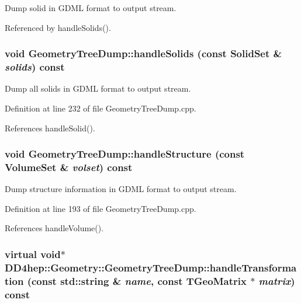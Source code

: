 Dump solid in GDML format to output stream. 

Referenced by handleSolids().\hypertarget{class_d_d4hep_1_1_geometry_1_1_geometry_tree_dump_a1cc5f19fc66c9e73f4837824f252a2c5}{
\subsubsection[{handleSolids}]{\setlength{\rightskip}{0pt plus 5cm}void GeometryTreeDump::handleSolids (const {\bf SolidSet} \& {\em solids}) const}}
\label{class_d_d4hep_1_1_geometry_1_1_geometry_tree_dump_a1cc5f19fc66c9e73f4837824f252a2c5}


Dump all solids in GDML format to output stream. 

Definition at line 232 of file GeometryTreeDump.cpp.

References handleSolid().\hypertarget{class_d_d4hep_1_1_geometry_1_1_geometry_tree_dump_aa8d35f8c4a4a98701c9e30e7af6a85e6}{
\subsubsection[{handleStructure}]{\setlength{\rightskip}{0pt plus 5cm}void GeometryTreeDump::handleStructure (const {\bf VolumeSet} \& {\em volset}) const}}
\label{class_d_d4hep_1_1_geometry_1_1_geometry_tree_dump_aa8d35f8c4a4a98701c9e30e7af6a85e6}


Dump structure information in GDML format to output stream. 

Definition at line 193 of file GeometryTreeDump.cpp.

References handleVolume().\hypertarget{class_d_d4hep_1_1_geometry_1_1_geometry_tree_dump_a58968dbc8b29ec78f28b8134df89fe02}{
\subsubsection[{handleTransformation}]{\setlength{\rightskip}{0pt plus 5cm}virtual void$\ast$ DD4hep::Geometry::GeometryTreeDump::handleTransformation (const std::string \& {\em name}, \/  const TGeoMatrix $\ast$ {\em matrix}) const}}
\label{class_d_d4hep_1_1_geometry_1_1_geometry_tree_dump_a58968dbc8b29ec78f28b8134df89fe02}



